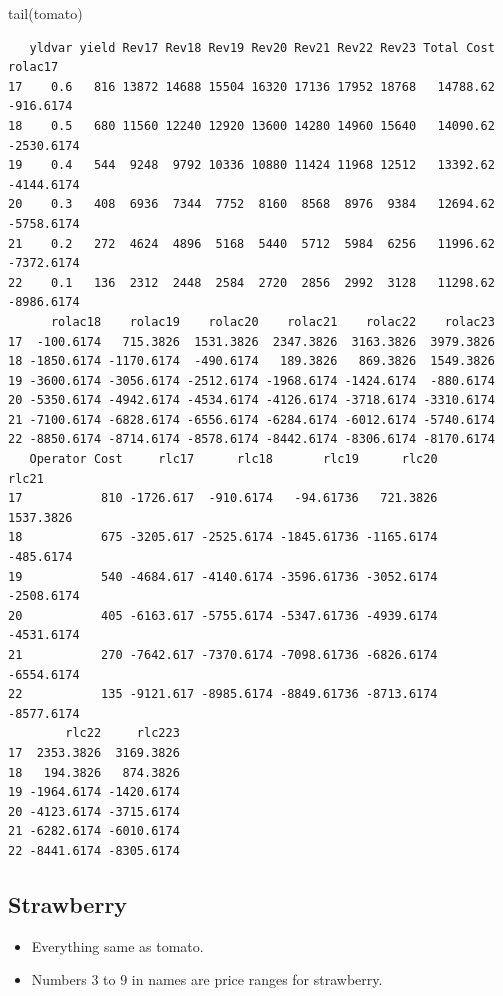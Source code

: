 \documentclass[
  letterpaper,
  DIV=11,
  numbers=noendperiod]{scrartcl}
\newenvironment{Shaded}{\begin{snugshade}}{\end{snugshade}}
\newcommand{\FunctionTok}[1]{\textcolor[rgb]{0.28,0.35,0.67}{#1}}
\newcommand{\NormalTok}[1]{\textcolor[rgb]{0.00,0.23,0.31}{#1}}
\begin{document}
\begin{Shaded}
\begin{Highlighting}[]
\FunctionTok{tail}\NormalTok{(tomato)}
\end{Highlighting}
\end{Shaded}

\begin{verbatim}
   yldvar yield Rev17 Rev18 Rev19 Rev20 Rev21 Rev22 Rev23 Total Cost    rolac17
17    0.6   816 13872 14688 15504 16320 17136 17952 18768   14788.62  -916.6174
18    0.5   680 11560 12240 12920 13600 14280 14960 15640   14090.62 -2530.6174
19    0.4   544  9248  9792 10336 10880 11424 11968 12512   13392.62 -4144.6174
20    0.3   408  6936  7344  7752  8160  8568  8976  9384   12694.62 -5758.6174
21    0.2   272  4624  4896  5168  5440  5712  5984  6256   11996.62 -7372.6174
22    0.1   136  2312  2448  2584  2720  2856  2992  3128   11298.62 -8986.6174
      rolac18    rolac19    rolac20    rolac21    rolac22    rolac23
17  -100.6174   715.3826  1531.3826  2347.3826  3163.3826  3979.3826
18 -1850.6174 -1170.6174  -490.6174   189.3826   869.3826  1549.3826
19 -3600.6174 -3056.6174 -2512.6174 -1968.6174 -1424.6174  -880.6174
20 -5350.6174 -4942.6174 -4534.6174 -4126.6174 -3718.6174 -3310.6174
21 -7100.6174 -6828.6174 -6556.6174 -6284.6174 -6012.6174 -5740.6174
22 -8850.6174 -8714.6174 -8578.6174 -8442.6174 -8306.6174 -8170.6174
   Operator Cost     rlc17      rlc18       rlc19      rlc20      rlc21
17           810 -1726.617  -910.6174   -94.61736   721.3826  1537.3826
18           675 -3205.617 -2525.6174 -1845.61736 -1165.6174  -485.6174
19           540 -4684.617 -4140.6174 -3596.61736 -3052.6174 -2508.6174
20           405 -6163.617 -5755.6174 -5347.61736 -4939.6174 -4531.6174
21           270 -7642.617 -7370.6174 -7098.61736 -6826.6174 -6554.6174
22           135 -9121.617 -8985.6174 -8849.61736 -8713.6174 -8577.6174
        rlc22     rlc223
17  2353.3826  3169.3826
18   194.3826   874.3826
19 -1964.6174 -1420.6174
20 -4123.6174 -3715.6174
21 -6282.6174 -6010.6174
22 -8441.6174 -8305.6174
\end{verbatim}

\subsection{Strawberry}\label{strawberry}

\begin{itemize}
\item
  Everything same as tomato.
\item
  Numbers 3 to 9 in names are price ranges for strawberry.
\end{itemize}
\end{document}
